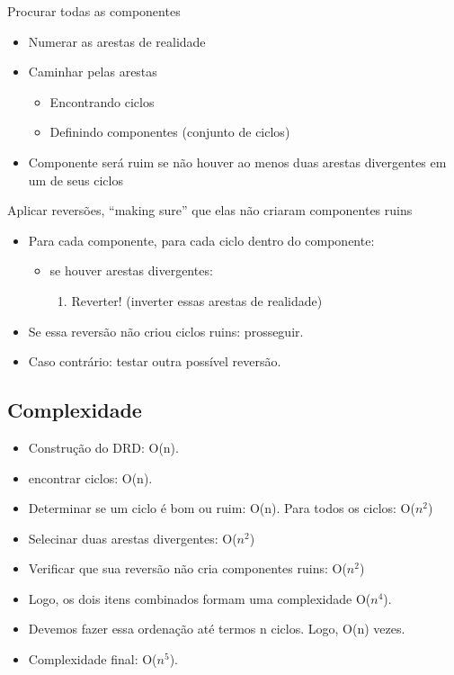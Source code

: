 \documentclass{beamer}
\begin{document}
\begin{frame} {Procurar todas as componentes}
	\begin{itemize}
		\item Numerar as arestas de realidade
  		\item Caminhar pelas arestas
		\begin {itemize}
			\item Encontrando ciclos
 			\item Definindo componentes (conjunto de ciclos)
		\end{itemize}
		\item Componente será ruim se não houver ao menos duas arestas divergentes em um de seus ciclos
	\end{itemize}
\end{frame}

\begin{frame} {Aplicar reversões, “making sure” que elas não criaram componentes ruins}
	\begin{itemize}
		\item Para cada componente, para cada ciclo dentro do componente: 
		\begin {itemize}
			\item se houver arestas divergentes:
			\begin{enumerate}
				\item Reverter!  (inverter essas arestas de realidade)
			\end{enumerate}
		\end {itemize}
		
		\item Se essa reversão não criou ciclos ruins: prosseguir.
  		\item Caso contrário: testar outra possível reversão.
	\end{itemize}
\end{frame}

\subsection{Complexidade}

\begin{frame}
	\begin{itemize}
		\item Construção do DRD: O(n).
		\item encontrar ciclos: O(n).
		\item Determinar se um ciclo é bom ou ruim: O(n). Para todos os ciclos: O($n^{2}$)
		\item Selecinar duas arestas divergentes: O($n^{2}$)
		\item Verificar que sua reversão não cria componentes ruins: O($n^{2}$)
		\pause \item Logo, os dois itens combinados formam uma complexidade O($n^{4}$).
		\pause \item Devemos fazer essa ordenação até termos n ciclos. Logo, O(n) vezes.
		\pause \item Complexidade final: O($n^{5}$).
	\end{itemize}
\end{frame}
	
\end{document}
